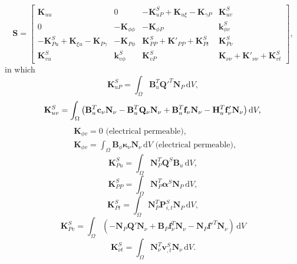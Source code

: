 \documentclass[times,fleqn,11pt]{elsarticle}
\begin{document}
\begin{equation}
    \mathbf{S}=\begin{bmatrix}
        \mathbf{K}_{uu} & 0 & -\mathbf{K}_{uP}^S+\mathbf{K}_{u\xi}-\mathbf{K}_{\gamma P} & \mathbf{K}_{uv}^S \\
        0 & -\mathbf{K}_{\phi\phi} & -\mathbf{K}_{\phi P} & {\mathbf{k}_{\phi v}^S} \\
        -\mathbf{K}_{Pu}^S+\mathbf{K}_{\xi u}-\mathbf{K}_{P \gamma} & -\mathbf{K}_{P\phi } & \mathbf{K}_{PP}^S+\mathbf{K}'_{PP}+\mathbf{K}_{Pt}^S & \mathbf{K}_{Pv}^S \\
        \mathbf{K}_{vu}^S & {\mathbf{k}_{v\phi}^S} & \mathbf{K}_{vP}^S & \mathbf{K}_{\nu\nu}+\mathbf{K}'_{\nu\nu}+\mathbf{K}_{vt}^S
    \end{bmatrix},
\end{equation}
in which 
\begin{equation}
    \mathbf{K}_{uP}^S=\int_\Omega \mathbf{B}_u^T \mathbf{Q}'^T \mathbf{N}_P\, \text{d}V,
\end{equation}
\begin{equation}
    \mathbf{K}_{uv}^S=\int_\Omega\left(\mathbf{B}_u^T\mathbf{c}_\nu\mathbf{N}_\nu-\mathbf{B}_u^T\mathbf{Q}_\nu\mathbf{N}_\nu+\mathbf{B}_u^T\mathbf{f}_\nu\mathbf{N}_\nu-\mathbf{H}_u^T\mathbf{f}_\nu'\mathbf{N}_\nu\right)\mathrm{d}V,\\
\end{equation}
\begin{equation}
    \begin{split}
    &{\mathbf{K}_{\phi v}}=0 \text{ (electrical permeable)},\;\\
    &{\mathbf{K}_{\phi v}}=\int_\Omega \mathbf{B}_\phi \mathbf{\kappa}_\nu \mathbf{N}_\nu\, \text{d}V \text{ (electrical permeable)},\;
\end{split}
\end{equation}
\begin{equation}
    \mathbf{K}_{Pu}^S=\int_\Omega \mathbf{N}_P^T \mathbf{Q}^S\mathbf{B}_u \, \text{d}V,
\end{equation}
\begin{equation}
    \mathbf{K}_{PP}^S=\int_\Omega \mathbf{N}_P^T \mathbf{\alpha}^S \mathbf{N}_P\, \text{d}V,
\end{equation}
\begin{equation}
    \mathbf{K}_{Pt}^S=\int_\Omega \mathbf{N}_P^T \mathbf{P}_{i,t}^S \mathbf{N}_P\, \text{d}V,
\end{equation}
\begin{equation}
    \mathbf{K}_{Pv}^S=\int_\Omega (-\mathbf{N}_P \mathbf{Q}'\mathbf{N}_\nu+\mathbf{B}_P\mathbf{f}_\nu^T\mathbf{N}_\nu-\mathbf{N}_P\mathbf{f}'^T\mathbf{N}_\nu)\, \text{d}V
\end{equation}
\begin{equation}
    \mathbf{K}_{\nu t}^S=\int_\Omega \mathbf{N}_\nu^T \mathbf{v}_{,t}^S \mathbf{N}_\nu\, \text{d}V.
\end{equation}
\end{document}
